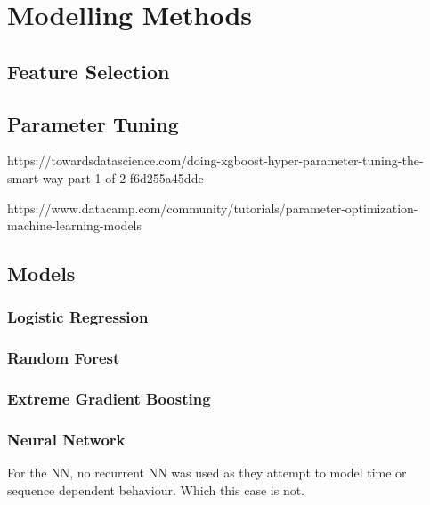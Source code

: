 \chapter{Modelling Methods} 
\label{Chapter4}

\section{Feature Selection}

\section{Parameter Tuning}

https://towardsdatascience.com/doing-xgboost-hyper-parameter-tuning-the-smart-way-part-1-of-2-f6d255a45dde

https://www.datacamp.com/community/tutorials/parameter-optimization-machine-learning-models

\section{Models}

\subsection{Logistic Regression}

\subsection{Random Forest}

\subsection{Extreme Gradient Boosting}

\subsection{Neural Network}

For the NN, no recurrent NN was used as they attempt to model time or sequence dependent behaviour. Which this case is not. 
